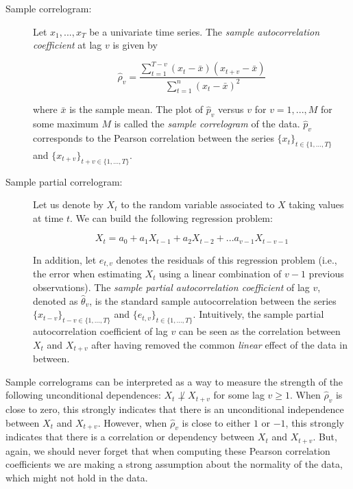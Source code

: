 \begin{description}
\item[Sample correlogram:] Let ${x_1,...,x_T}$ be a univariate time series. The \emph{sample autocorrelation coefficient} at lag $v$ is given by 

$$ \hat{\rho}_v =\frac{\sum_{t=1}^{T-v} (x_t-\bar{x})(x_{t+v}-\bar{x})}{\sum_{t=1}^{n} (x_t-\bar{x})^2}$$ 

\noindent where $\bar{x}$ is the sample mean. The plot of $\hat{p}_v$ versus $v$ for $v=1,..., M$ for some maximum $M$ is called the \emph{sample correlogram} of the data. $\hat{p}_v$ corresponds to the Pearson correlation between the series $\{x_t\}_{t\in\{1,...,T\}}$ and $\{x_{t+v}\}_{t+v\in\{1,...,T\}}$.

\item[Sample partial correlogram:] Let us denote by $X_t$ to the random variable associated to $X$ taking values at time $t$. We can build the following regression problem:

$$ X_t = a_0 + a_1X_{t-1} + a_2X_{t-2} + ... a_{v-1}X_{t-v-1}$$

In addition, let $e_{t,v}$ denotes the residuals of this regression problem (i.e., the error when estimating $X_t$ using a linear combination of $v-1$ previous observations). The \emph{sample partial autocorrelation coefficient} of lag $v$, denoted as  $\hat{\theta}_v$, is the standard sample autocorrelation between  the series $\{x_{t-v}\}_{t-v\in\{1,...,T\}}$ and $\{e_{t,v}\}_{t\in\{1,...,T\}}$. Intuitively, the sample partial autocorrelation coefficient of lag $v$ can be seen as the correlation between $X_t$ and $X_{t+v}$ after having removed the common \emph{linear} effect of the data in between.
\end{description}

Sample correlograms can be interpreted as a way to measure the strength of the following unconditional dependences: $X_t  \not\perp X_{t+v}$ for some lag $v \geq 1$.  When $\hat{\rho}_v$ is close to zero, this strongly indicates that there is an unconditional independence between $X_t$ and $X_{t+v}$. However, when $\hat{\rho}_v$ is close to either $1$ or $-1$, this strongly indicates that there is a correlation or dependency between $X_t$ and $X_{t+v}$. But, again, we should never forget that when computing these Pearson correlation coefficients we are making a strong assumption about the normality of the data, which might not hold in the data.

